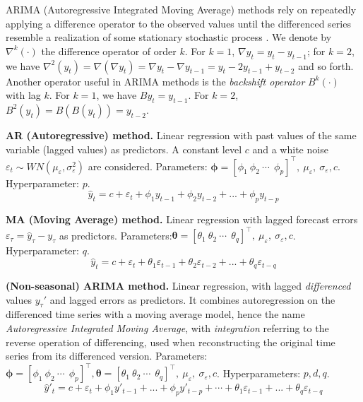 ARIMA (Autoregressive Integrated Moving Average) methods \cite{box1970distribution} rely on repeatedly applying a difference operator to the observed values until the differenced series resemble a realization of some stationary stochastic process \cite{brockwell1990methods}.
We denote by $\nabla^k(\cdot)$ the difference operator of order $k$. For $k=1$, $\nabla y_t = y_t - y_{t-1}$; for $k=2$, we have $\nabla^2(y_t) = \nabla(\nabla y_t) = \nabla y_t - \nabla y_{t-1} = y_t -2y_{t-1} + y_{t-2}$  and so forth.
Another operator useful in ARIMA methods is the \textit{backshift operator} $B^k(\cdot)$ with lag $k$. For $k=1$, we have $B y_t = y_{t-1}$. For $k=2$, $B^2(y_t) = B(B(y_t)) = y_{t-2}$.

\vspace{1em}
\noindent
\textbf{AR (Autoregressive) method.}  Linear regression with past values of the same variable (lagged values) as predictors. A constant level $c$ and a white noise $\varepsilon_t \sim WN(\mu_\varepsilon, \sigma^2_\varepsilon)$ are considered. Parameters: $\boldsymbol{\phi} = [\phi_1 \ \phi_2 \ \cdots \ \ \phi_p]^\top, \ \mu_\varepsilon, \ \sigma_\varepsilon, c$. Hyperparameter: $p$.
\begin{equation}\label{eq:ar}
\hat{y}_t = c + \varepsilon_t + \phi_1 y_{t-1} + \phi_2 y_{t-2} + ... + \phi_p y_{t-p}
\end{equation}

\noindent
\textbf{MA (Moving Average) method.} Linear regression with lagged forecast errors $\varepsilon_\tau = \hat{y}_\tau - y_\tau$ as predictors. Parameters:$\boldsymbol{\theta} = [\theta_1 \ \theta_2 \ \cdots \ \ \theta_q]^\top, \ \mu_\varepsilon, \ \sigma_\varepsilon, c$. Hyperparameter: $q$.
\begin{equation}\label{eq:ma}
    \hat{y}_t = c + \varepsilon_{t} + \theta_1 \varepsilon_{t-1} + \theta_2 \varepsilon_{t-2} + ... + \theta_q \varepsilon_{t-q}
\end{equation}

\noindent
\textbf{(Non-seasonal) ARIMA method.} Linear regression, with lagged \textit{differenced} values $y_\tau'$ and lagged errors as predictors. It combines autoregression on the differenced time series with a moving average model, hence the name \textit{Autoregressive Integrated Moving Average}, with \textit{integration} referring to the reverse operation of differencing, used when reconstructing the original time series from its differenced version. Parameters:   $\boldsymbol{\phi} = [\phi_1 \ \phi_2 \ \cdots \ \ \phi_p]^\top,\boldsymbol{\theta} = [\theta_1 \ \theta_2 \ \cdots \ \ \theta_q]^\top, \ \mu_\varepsilon, \ \sigma_\varepsilon, c$. Hyperparameters: $p, d, q$.
\begin{equation}\label{eq:arima}
\hat{y}'_t = c + \varepsilon_t + \phi_1 y'_{t-1} + ... + \phi_p y'_{t-p} + \cdots + \theta_1 \varepsilon_{t-1} + ... + \theta_q \varepsilon_{t-q}
\end{equation}

